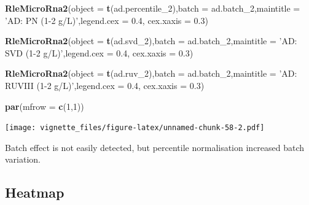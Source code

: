 \documentclass[]{book}
\newenvironment{Shaded}{\begin{snugshade}}{\end{snugshade}}
\newcommand{\KeywordTok}[1]{\textcolor[rgb]{0.13,0.29,0.53}{\textbf{#1}}}
\newcommand{\DataTypeTok}[1]{\textcolor[rgb]{0.13,0.29,0.53}{#1}}
\newcommand{\DecValTok}[1]{\textcolor[rgb]{0.00,0.00,0.81}{#1}}
\newcommand{\FloatTok}[1]{\textcolor[rgb]{0.00,0.00,0.81}{#1}}
\newcommand{\StringTok}[1]{\textcolor[rgb]{0.31,0.60,0.02}{#1}}
\newcommand{\NormalTok}[1]{#1}
\begin{document}
\begin{Shaded}
\begin{Highlighting}[]
\KeywordTok{RleMicroRna2}\NormalTok{(}\DataTypeTok{object =} \KeywordTok{t}\NormalTok{(ad.percentile_}\DecValTok{2}\NormalTok{),}\DataTypeTok{batch =}\NormalTok{ ad.batch_}\DecValTok{2}\NormalTok{,}\DataTypeTok{maintitle =} \StringTok{'AD: PN (1-2 g/L)'}\NormalTok{,}\DataTypeTok{legend.cex =} \FloatTok{0.4}\NormalTok{, }\DataTypeTok{cex.xaxis =} \FloatTok{0.3}\NormalTok{)}

\KeywordTok{RleMicroRna2}\NormalTok{(}\DataTypeTok{object =} \KeywordTok{t}\NormalTok{(ad.svd_}\DecValTok{2}\NormalTok{),}\DataTypeTok{batch =}\NormalTok{ ad.batch_}\DecValTok{2}\NormalTok{,}\DataTypeTok{maintitle =} \StringTok{'AD: SVD (1-2 g/L)'}\NormalTok{,}\DataTypeTok{legend.cex =} \FloatTok{0.4}\NormalTok{, }\DataTypeTok{cex.xaxis =} \FloatTok{0.3}\NormalTok{)}

\KeywordTok{RleMicroRna2}\NormalTok{(}\DataTypeTok{object =} \KeywordTok{t}\NormalTok{(ad.ruv_}\DecValTok{2}\NormalTok{),}\DataTypeTok{batch =}\NormalTok{ ad.batch_}\DecValTok{2}\NormalTok{,}\DataTypeTok{maintitle =} \StringTok{'AD: RUVIII (1-2 g/L)'}\NormalTok{,}\DataTypeTok{legend.cex =} \FloatTok{0.4}\NormalTok{, }\DataTypeTok{cex.xaxis =} \FloatTok{0.3}\NormalTok{)}

\KeywordTok{par}\NormalTok{(}\DataTypeTok{mfrow =} \KeywordTok{c}\NormalTok{(}\DecValTok{1}\NormalTok{,}\DecValTok{1}\NormalTok{))}
\end{Highlighting}
\end{Shaded}

\texttt{[image: vignette\_files/figure-latex/unnamed-chunk-58-2.pdf]}

Batch effect is not easily detected, but percentile normalisation
increased batch variation.

\subsection{Heatmap}\label{heatmap-1}
\end{document}

